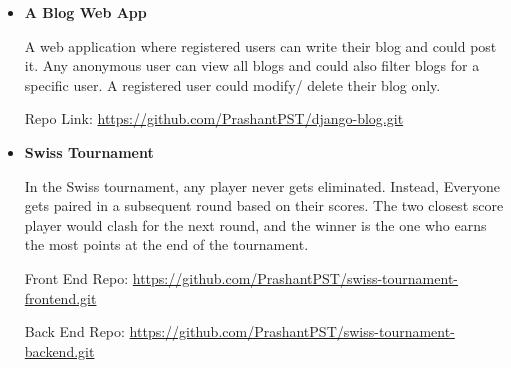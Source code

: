 \documentclass{moderncv}
\begin{document}
\begin{itemize}

\item{\textbf{A Blog Web App}} 
\vspace{3pt}

A web application where registered users can write their blog and could post it. Any anonymous user can view all blogs and could also filter blogs for a specific user. A registered user could modify/ delete their blog only. 

\vspace{2pt}

Repo Link: \url{https://github.com/PrashantPST/django-blog.git}

\vspace{3pt}

\item{\textbf{Swiss Tournament}} 
\vspace{3pt}

In the Swiss tournament, any player never gets eliminated. Instead, Everyone gets paired in a subsequent round based on their scores. The two closest score player would clash for the next round, and the winner is the one who earns the most points at the end of the tournament.

\vspace{2pt}

Front End Repo: \url{https://github.com/PrashantPST/swiss-tournament-frontend.git}

\vspace{1pt}

Back End Repo: \url{https://github.com/PrashantPST/swiss-tournament-backend.git}


\end{itemize}
\end{document}
